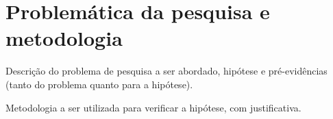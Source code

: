 \chapter{Problemática da pesquisa e metodologia}

Descrição do problema de pesquisa a ser abordado, hipótese e pré-evidências (tanto do problema quanto para a hipótese).

Metodologia a ser utilizada para verificar a hipótese, com justificativa.
